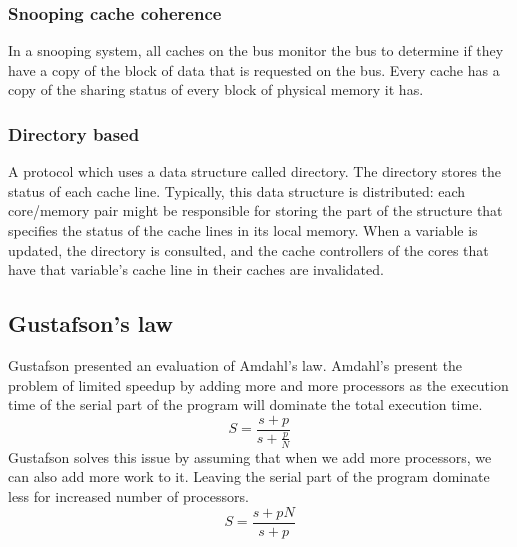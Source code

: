 \documentclass[12pt]{article}
\begin{document}
\subsubsection{Snooping cache coherence}
In a snooping system, all caches on the bus monitor the bus to determine if they have a copy of the block of data that is requested on the bus. Every cache has a copy of the sharing status of every block of physical memory it has.
\subsubsection{Directory based}
A protocol which uses a data structure called directory. The directory stores the status of each cache line. Typically, this data structure is distributed: each core/memory pair might be responsible for storing the part of the structure that specifies the status of the cache lines in its local memory. When a variable is updated, the directory is consulted, and the cache controllers of the cores that have that variable's cache line in their caches are invalidated. 
\subsection{Gustafson's law}
Gustafson presented an evaluation of Amdahl's law. Amdahl's present the problem of limited speedup by adding more and more processors as the execution time of the serial part of the program will dominate the total execution time.
\begin{equation}
S = \frac{s + p}{s + \frac{p}{N}}
\end{equation}
Gustafson solves this issue by assuming that when we add more processors, we can also add more work to it. Leaving the serial part of the program dominate less for increased number of processors.
\begin{equation}
S = \frac{s+pN}{s+p}
\end{equation}
\end{document}
